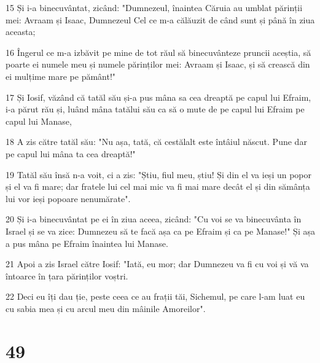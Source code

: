 \par 15 Și i-a binecuvântat, zicând: "Dumnezeul, înaintea Căruia au umblat părinții mei: Avraam și Isaac, Dumnezeul Cel ce m-a călăuzit de când sunt și până în ziua aceasta;
\par 16 Îngerul ce m-a izbăvit pe mine de tot răul să binecuvânteze pruncii aceștia, să poarte ei numele meu și numele părinților mei: Avraam și Isaac, și să crească din ei mulțime mare pe pământ!"
\par 17 Și Iosif, văzând că tatăl său și-a pus mâna sa cea dreaptă pe capul lui Efraim, i-a părut rău și, luând mâna tatălui său ca să o mute de pe capul lui Efraim pe capul lui Manase,
\par 18 A zis către tatăl său: "Nu așa, tată, că cestălalt este întâiul născut. Pune dar pe capul lui mâna ta cea dreaptă!"
\par 19 Tatăl său însă n-a voit, ci a zis: "Știu, fiul meu, știu! Și din el va ieși un popor și el va fi mare; dar fratele lui cel mai mic va fi mai mare decât el și din sămânța lui vor ieși popoare nenumărate".
\par 20 Și i-a binecuvântat pe ei în ziua aceea, zicând: "Cu voi se va binecuvânta în Israel și se va zice: Dumnezeu să te facă așa ca pe Efraim și ca pe Manase!" Și așa a pus mâna pe Efraim înaintea lui Manase.
\par 21 Apoi a zis Israel către Iosif: "Iată, eu mor; dar Dumnezeu va fi cu voi și vă va întoarce în țara părinților voștri.
\par 22 Deci eu îți dau ție, peste ceea ce au frații tăi, Sichemul, pe care l-am luat eu cu sabia mea și cu arcul meu din mâinile Amoreilor".

\chapter{49}

